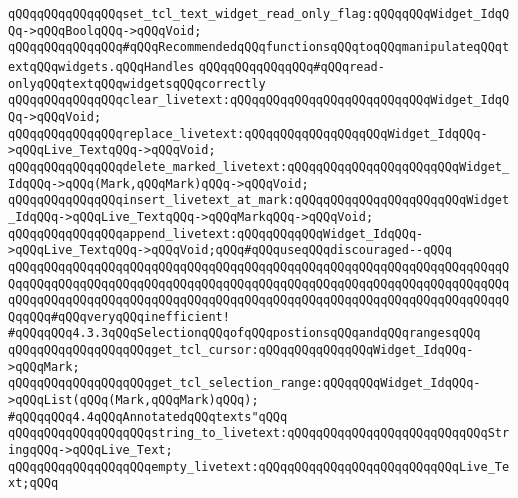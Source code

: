 \verb|qQQqqQQqqQQqqQQqset_tcl_text_widget_read_only_flag:qQQqqQQqWidget_IdqQQq->qQQqBoolqQQq->qQQqVoid;|\newline
\newline
\verb|qQQqqQQqqQQqqQQq#qQQqRecommendedqQQqfunctionsqQQqtoqQQqmanipulateqQQqtextqQQqwidgets.qQQqHandles|\newline
\verb|qQQqqQQqqQQqqQQq#qQQqread-onlyqQQqtextqQQqwidgetsqQQqcorrectly|\newline
\verb|qQQqqQQqqQQqqQQqclear_livetext:qQQqqQQqqQQqqQQqqQQqqQQqqQQqWidget_IdqQQq->qQQqVoid;|\newline
\verb|qQQqqQQqqQQqqQQqreplace_livetext:qQQqqQQqqQQqqQQqqQQqWidget_IdqQQq->qQQqLive_TextqQQq->qQQqVoid;|\newline
\verb|qQQqqQQqqQQqqQQqdelete_marked_livetext:qQQqqQQqqQQqqQQqqQQqqQQqWidget_IdqQQq->qQQq(Mark,qQQqMark)qQQq->qQQqVoid;|\newline
\verb|qQQqqQQqqQQqqQQqinsert_livetext_at_mark:qQQqqQQqqQQqqQQqqQQqqQQqWidget_IdqQQq->qQQqLive_TextqQQq->qQQqMarkqQQq->qQQqVoid;|\newline
\verb|qQQqqQQqqQQqqQQqappend_livetext:qQQqqQQqqQQqWidget_IdqQQq->qQQqLive_TextqQQq->qQQqVoid;qQQq#qQQquseqQQqdiscouraged--qQQq|\newline
\verb|qQQqqQQqqQQqqQQqqQQqqQQqqQQqqQQqqQQqqQQqqQQqqQQqqQQqqQQqqQQqqQQqqQQqqQQqqQQqqQQqqQQqqQQqqQQqqQQqqQQqqQQqqQQqqQQqqQQqqQQqqQQqqQQqqQQqqQQqqQQqqQQqqQQqqQQqqQQqqQQqqQQqqQQqqQQqqQQqqQQqqQQqqQQqqQQqqQQqqQQqqQQqqQQqqQQqqQQq#qQQqveryqQQqinefficient!|\newline
\newline
\newline
\verb|#qQQqqQQq4.3.3qQQqSelectionqQQqofqQQqpostionsqQQqandqQQqrangesqQQq|\newline
\newline
\verb|qQQqqQQqqQQqqQQqqQQqget_tcl_cursor:qQQqqQQqqQQqqQQqWidget_IdqQQq->qQQqMark;|\newline
\verb|qQQqqQQqqQQqqQQqqQQqget_tcl_selection_range:qQQqqQQqWidget_IdqQQq->qQQqList(qQQq(Mark,qQQqMark)qQQq);|\newline
\newline
\verb|#qQQqqQQq4.4qQQqAnnotatedqQQqtexts"qQQq|\newline
\verb|qQQqqQQqqQQqqQQqqQQqstring_to_livetext:qQQqqQQqqQQqqQQqqQQqqQQqqQQqStringqQQq->qQQqLive_Text;|\newline
\verb|qQQqqQQqqQQqqQQqqQQqempty_livetext:qQQqqQQqqQQqqQQqqQQqqQQqqQQqLive_Text;qQQq|\newline
\newline
